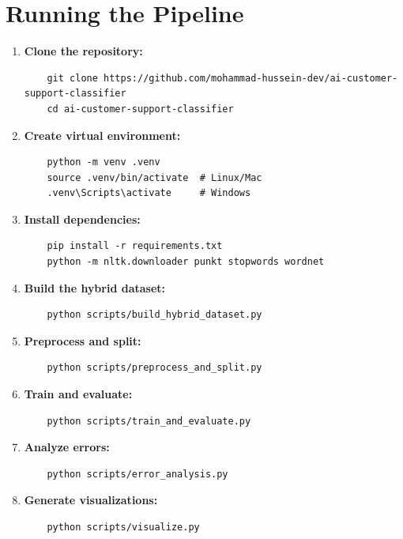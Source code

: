 \documentclass[12pt,a4paper]{article}
\begin{document}
\section{Running the Pipeline}
\label{app:running}

\begin{enumerate}[leftmargin=*]
    \item \textbf{Clone the repository:}
    \begin{verbatim}
    git clone https://github.com/mohammad-hussein-dev/ai-customer-support-classifier
    cd ai-customer-support-classifier
    \end{verbatim}

    \item \textbf{Create virtual environment:}
    \begin{verbatim}
    python -m venv .venv
    source .venv/bin/activate  # Linux/Mac
    .venv\Scripts\activate     # Windows
    \end{verbatim}

    \item \textbf{Install dependencies:}
    \begin{verbatim}
    pip install -r requirements.txt
    python -m nltk.downloader punkt stopwords wordnet
    \end{verbatim}

    \item \textbf{Build the hybrid dataset:}
    \begin{verbatim}
    python scripts/build_hybrid_dataset.py
    \end{verbatim}

    \item \textbf{Preprocess and split:}
    \begin{verbatim}
    python scripts/preprocess_and_split.py
    \end{verbatim}

    \item \textbf{Train and evaluate:}
    \begin{verbatim}
    python scripts/train_and_evaluate.py
    \end{verbatim}

    \item \textbf{Analyze errors:}
    \begin{verbatim}
    python scripts/error_analysis.py
    \end{verbatim}

    \item \textbf{Generate visualizations:}
    \begin{verbatim}
    python scripts/visualize.py
    \end{verbatim}


\end{enumerate}
\end{document}
